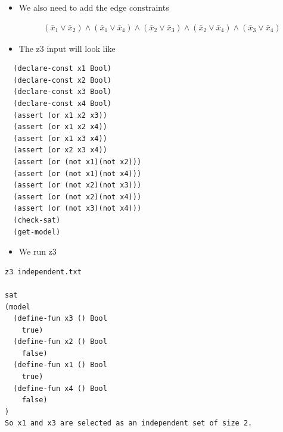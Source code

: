 \documentclass{beamer}
\begin{document}
\begin{frame}[fragile]
  \begin{itemize}
  \item We also need to add the edge constraints



  \begin{align*}
    (\bar{x}_1\vee \bar{x}_2)\wedge (\bar{x}_1\vee \bar{x}_4)\wedge (\bar{x}_2\vee \bar{x}_3)\wedge (\bar{x}_2\vee \bar{x}_4)\wedge (\bar{x}_3\vee\bar{x}_4)
  \end{align*}
\item The z3 input will look like
  \end{itemize}
  \small{
\begin{verbatim}
  (declare-const x1 Bool)
  (declare-const x2 Bool)
  (declare-const x3 Bool)
  (declare-const x4 Bool)
  (assert (or x1 x2 x3))
  (assert (or x1 x2 x4))
  (assert (or x1 x3 x4))
  (assert (or x2 x3 x4))
  (assert (or (not x1)(not x2)))
  (assert (or (not x1)(not x4)))
  (assert (or (not x2)(not x3)))
  (assert (or (not x2)(not x4)))
  (assert (or (not x3)(not x4)))
  (check-sat)
  (get-model)
\end{verbatim}  }
\end{frame}
\begin{frame}[fragile]

  \begin{itemize}
  \item We run z3 

  \end{itemize}

\begin{verbatim}
z3 independent.txt 

sat
(model
  (define-fun x3 () Bool
    true)
  (define-fun x2 () Bool
    false)
  (define-fun x1 () Bool
    true)
  (define-fun x4 () Bool
    false)
)
So x1 and x3 are selected as an independent set of size 2.
\end{verbatim}
\end{frame}
\end{document}

